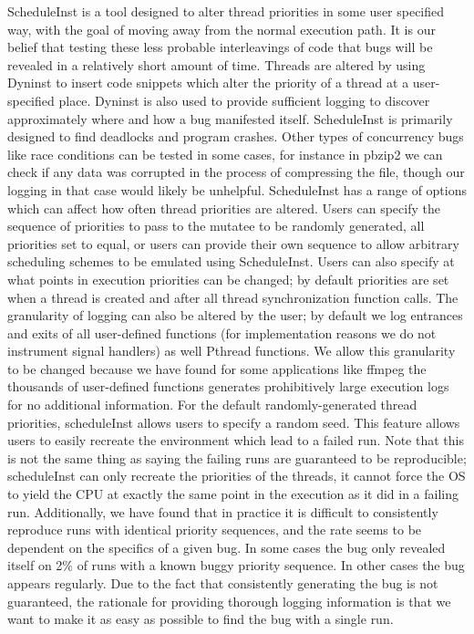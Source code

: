 \documentclass[10pt,]{article} %
\begin{document}
	ScheduleInst is a tool designed to alter thread priorities in some user specified way, with the goal of moving away from the normal execution path.  It is our belief that testing these less probable interleavings of code that bugs will be revealed in a relatively short amount of time.  Threads are altered by using Dyninst to insert code snippets which alter the priority of a thread at a user-specified place. Dyninst is also used to provide sufficient logging to discover approximately where and how a bug manifested itself. ScheduleInst is primarily designed to find deadlocks and program crashes.  Other types of concurrency bugs like race conditions can be tested in some cases, for instance in pbzip2 we can check if any data was corrupted in the process of compressing the file, though our logging in that case would likely be unhelpful.  
	ScheduleInst has a range of options which can affect how often thread priorities are altered.  Users can specify the sequence of priorities to pass to the mutatee to be randomly generated, all priorities set to equal, or users can provide their own sequence to allow arbitrary scheduling schemes to be emulated using ScheduleInst.  Users can also specify at what points in execution priorities can be changed; by default priorities are set when a thread is created and after all thread synchronization function calls.  The granularity of logging can also be altered by the user; by default we log entrances and exits of all user-defined functions (for implementation reasons we do not instrument signal handlers) as well Pthread functions.  We allow this granularity to be changed because we have found for some applications like ffmpeg the thousands of user-defined functions generates prohibitively large execution logs for no additional information.    
	For the default randomly-generated thread priorities, scheduleInst allows users to specify a random seed. This feature allows users to easily recreate the environment which lead to a failed run.  Note that this is not the same thing as saying the failing runs are guaranteed to be reproducible; scheduleInst can only recreate the priorities of the threads, it cannot force the OS to yield the CPU at exactly the same point in the execution as it did in a failing run.  Additionally, we have found that in practice it is difficult to consistently  reproduce runs with identical priority sequences, and the rate seems to be dependent on the specifics of a given bug. In some cases the bug only revealed itself on 2\% of runs with a known buggy priority sequence.  In other cases the bug appears regularly.  Due to the fact that consistently generating the bug is not guaranteed,  the rationale for providing thorough logging information is that we want to make it as easy as possible to find the bug with a single run. 
\end{document}
